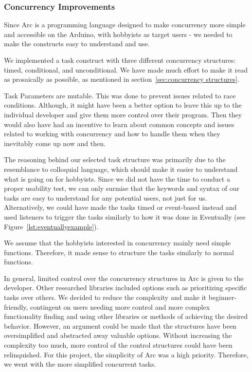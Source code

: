 \subsubsection{Concurrency Improvements}

Since Arc is a programming language designed to make concurrency more simple and accessible on the Arduino, with hobbyists as target users - we needed to make the constructs easy to understand and use. 

We implemented a task construct with three different concurrency structures: timed, conditional, and unconditional. We have made much effort to make it read as prosaically as possible, as mentioned in section~\ref{sec:concurrency structures}. 

Task Parameters are mutable. This was done to prevent issues related to race conditions. Although, it might have been a better option to leave this up to the individual developer and give them more control over their program. Then they would also have had an incentive to learn about common concepts and issues related to working with concurrency and how to handle them when they inevitably come up now and then.

The reasoning behind our selected task structure was primarily due to the resemblance to colloquial language, which should make it easier to understand what is going on for hobbyists. Since we did not have the time to conduct a proper usability test, we can only surmise that the keywords and syntax of our tasks are easy to understand for any potential users, not just for us. Alternatively, we could have made the tasks timed or event-based instead and used listeners to trigger the tasks similarly to how it was done in Eventually (see Figure~\ref{lst:eventuallyexample}).

We assume that the hobbyists interested in concurrency mainly need simple functions. Therefore, it made sense to structure the tasks similarly to normal functions.

In general, limited control over the concurrency structures in Arc is given to the developer. Other researched libraries included options such as prioritizing specific tasks over others. We decided to reduce the complexity and make it beginner-friendly, contingent on users needing more control and more complex functionality finding and using other libraries or methods of achieving the desired behavior. However, an argument could be made that the structures have been oversimplified and abstracted away valuable options. Without increasing the complexity too much, more control of the control structures could have been relinquished. For this project, the simplicity of Arc was a high priority. Therefore, we went with the more simplified concurrent tasks.

